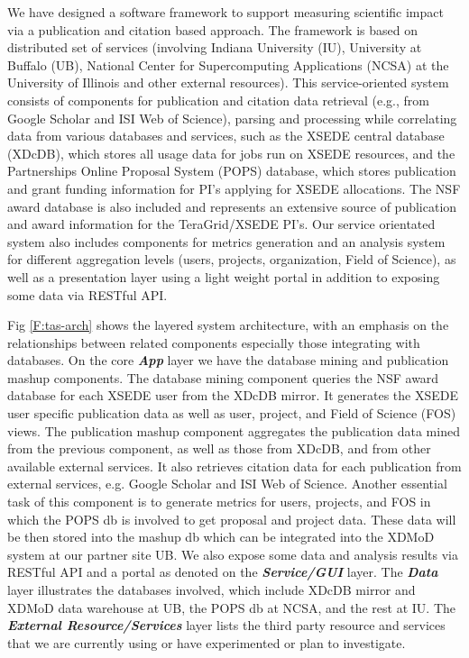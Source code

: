 \documentclass{sig-alternate}
\begin{document}
We have designed a software framework to support measuring scientific impact via a publication and citation based approach. The framework is based on distributed set of services (involving Indiana University (IU), University at Buffalo (UB), National Center for Supercomputing Applications (NCSA) at the University of Illinois and other external resources). This service-oriented system consists of components for publication and citation data retrieval (e.g., from Google Scholar and ISI Web of Science), parsing and processing while correlating data from various databases and services, such as the XSEDE central database (XDcDB), which stores all usage data for jobs run on XSEDE resources, and the Partnerships Online Proposal System (POPS) database, which stores publication and grant funding information for PI's applying for XSEDE allocations. The NSF award database is also included and represents an extensive source of publication and award information for the TeraGrid/XSEDE PI's. Our service orientated system also includes components for metrics generation and an analysis system for different aggregation levels (users, projects, organization, Field of Science), as well as a presentation layer using a light weight portal in addition to exposing some data via RESTful API.

Fig \ref{F:tas-arch} shows the layered system architecture, with an emphasis on the relationships between related components especially those integrating with databases. On the core \emph{\textbf{App}} layer we have the database mining and publication mashup components. The database mining component queries the NSF award database for each XSEDE user from the XDcDB mirror. It generates the XSEDE user specific publication data as well as user, project, and Field of Science (FOS) views. The publication mashup component aggregates the publication data mined from the previous component, as well as those from XDcDB, and from other available external services. It also retrieves citation data for each publication from external services, e.g. Google Scholar and ISI Web of Science. Another essential task of this component is to generate metrics for users, projects, and FOS in which the POPS db is involved to get proposal and project data. These data will be then stored into the mashup db which can be integrated into the XDMoD \cite{CPE:CPE2871,Browne:2013:ECD:2503210.2503230,browne2014comprehensive,Furlani:2013:UXF:2484762.2484763,Lu:2013:CJL:2484762.2484781} system at our partner site UB. We also expose some data and analysis results via RESTful API and a portal as denoted on the \emph{\textbf{Service/GUI}} layer. The \emph{\textbf{Data}} layer illustrates the databases involved, which include XDcDB mirror and XDMoD data warehouse at UB, the POPS db at NCSA, and the rest at IU. The \emph{\textbf{External Resource/Services}} layer lists the third party resource and services that we are currently using or have experimented or plan to investigate.
\end{document}
